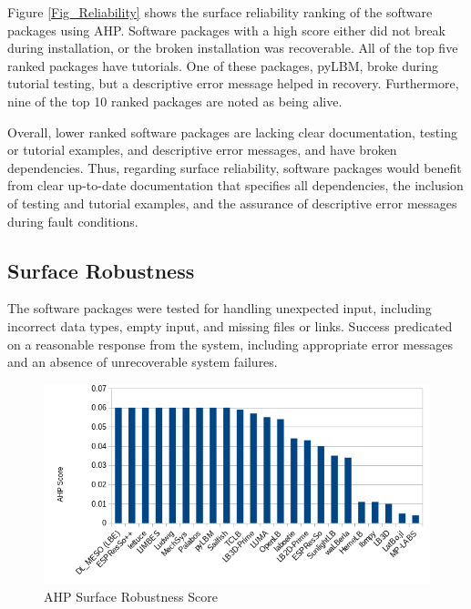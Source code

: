 \documentclass[12pt, notitlepage]{article}
\begin{document}
Figure \ref{Fig_Reliability} shows the surface reliability ranking of the software packages using AHP. Software packages with a high score either did not break during installation, or the broken installation was recoverable. All of the top five ranked packages have tutorials. One of these packages, pyLBM, broke during tutorial testing, but a descriptive error message helped in recovery. Furthermore, nine of the top 10 ranked packages are noted as being alive. 

Overall, lower ranked software packages are lacking clear documentation, testing or tutorial examples, and descriptive error messages, and have broken dependencies. Thus, regarding surface reliability, software packages would benefit from clear up-to-date documentation that specifies all dependencies, the inclusion of testing and tutorial examples, and the assurance of descriptive error messages during fault conditions.

\subsection{Surface Robustness}

The software packages were tested for handling unexpected input, including incorrect data types, empty input, and missing files or links. Success predicated on a reasonable response from the system, including appropriate error messages and an absence of unrecoverable system failures. 

\begin{figure}[h!]
	\begin{center}
		\includegraphics[width=1.0\textwidth]{robustness_chart}
		\caption{AHP Surface Robustness Score}
		\label{Fig_Robustness}
	\end{center}
\end{figure}
\end{document}
